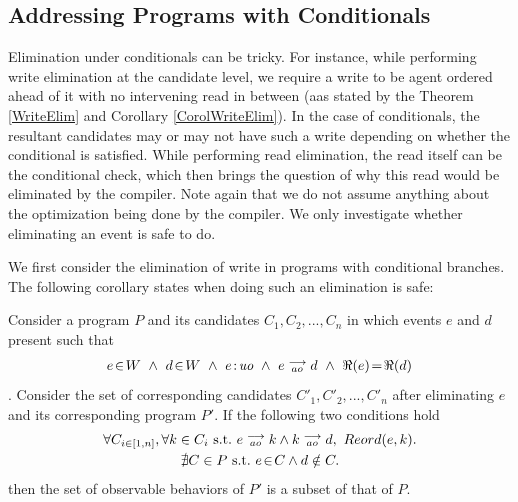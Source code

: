 \subsection{Addressing Programs with Conditionals}
    
    Elimination under conditionals can be tricky. 
    For instance, while performing write elimination at the candidate level, we require a write to be agent ordered ahead of it with no intervening read in between (aas stated by the Theorem \ref{WriteElim} and Corollary \ref{CorolWriteElim}).
    In the case of conditionals, the resultant candidates may or may not have such a write depending on whether the conditional is satisfied. 
    While performing read elimination, the read itself can be the conditional check, which then brings the question of why this read would be eliminated by the compiler.
    Note again that we do not assume anything about the optimization being done by the compiler. 
    We only investigate whether eliminating an event is safe to do.  

    We first consider the elimination of write in programs with conditional branches. The following corollary states when doing such an elimination is safe: 

    \begin{corollary}
        \label{WriteElimCond}
        Consider a program $P$ and its candidates $C_1, C_2, ... , C_n$ in which events $e$ and $d$ present such that 
        \begin{align*}
            \event{e}{W} \ \wedge \ \event{d}{W} \ \wedge \ \et{e}{uo} \ \wedge \ \reln{e}{ao}{d} \ \wedge \ \Re(e)\!=\!\Re(d)
        \end{align*} . 
        Consider the set of corresponding candidates $C'_1, C'_2, ... , C'_n$ after eliminating $e$ and its corresponding program $P'$. If the following two conditions hold
        \begin{gather*}
            \forall C_{i \in [1,n]}, \forall k \in C_i \ \text{s.t.} \ \reln{e}{ao}{k} \wedge \reln{k}{ao}{d}, \    
            Reord(e,k). \\   
            \nexists C \in P \ \text{s.t.} \ \event{e}{C} \wedge d \notin C.
        \end{gather*}
        then the set of observable behaviors of $P'$ is a subset of that of $P$.
    \end{corollary}

